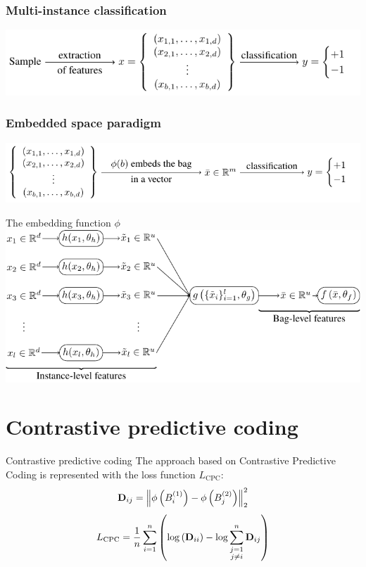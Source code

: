 \documentclass[10pt]{beamer}
\newcommand{\mathmat}{\ensuremath{\mathbf}}
\begin{document}
\begin{frame}[c]\frametitle{Multi-instance classification}
	\centering
	\includegraphics{images/multi_instance_learning/multi_instance_learning.pdf}
\end{frame}

\begin{frame}[c]\frametitle{Embedded space paradigm}
	\centering
	\includegraphics[width=0.9\pagewidth]{images/embedded_space_paradigm/embedded_space_paradigm.pdf}
\end{frame}

\begin{frame}{The embedding function \( \phi \)}
	\centering
	\includegraphics[width=0.9\pagewidth]{images/embedding_function/embedding_function.pdf}
\end{frame}

\section{Contrastive predictive coding}

\begin{frame}{Contrastive predictive coding}
	The approach based on Contrastive Predictive Coding is represented with the loss function \( L_\mathrm{CPC} \):
	\[ \mathmat{D}_{ij} = \left\lVert \phi \left( B_i^{(1)} \right) - \phi \left( B_j^{(2)} \right) \right\rVert_2^2 \]
	\[ L_\mathrm{CPC} = \frac{1}{n} \sum_{i = 1}^n \left( \log \left( \mathmat{D}_{ii} \right) - \log \sum_{\substack{j = 1 \\ j \neq i}}^n \mathmat{D}_{ij} \right) \]
\end{frame}
\end{document}

